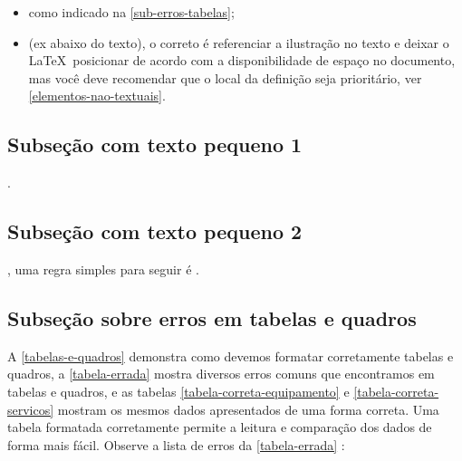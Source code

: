 \begin{itemize}
    \item {} como indicado na \autoref{sub-erros-tabelas};

    \item {} (ex abaixo do texto), o correto é referenciar a ilustração no texto e deixar o \LaTeX\ posicionar de acordo com a disponibilidade de espaço no documento, mas você deve recomendar que o local da definição seja prioritário, ver \autoref{elementos-nao-textuais}.
    
\end{itemize}


\subsection{Subseção com texto pequeno 1}
\label{erros-comuns-sub-pequena1}
.

\subsection{Subseção com texto pequeno 2}
\label{erros-comuns-sub-pequena2}
, uma regra simples para seguir é .


\subsection{Subseção sobre erros em tabelas e quadros}
\label{sub-erros-tabelas}
A \autoref{tabelas-e-quadros} demonstra como devemos formatar corretamente tabelas e quadros, a \autoref{tabela-errada} mostra diversos erros comuns que encontramos em tabelas e quadros, e as tabelas \ref{tabela-correta-equipamento} e \ref{tabela-correta-servicos} mostram os mesmos dados apresentados de uma forma correta. Uma tabela formatada corretamente permite a leitura e comparação dos dados de forma mais fácil. Observe a lista de erros da \autoref{tabela-errada} :


